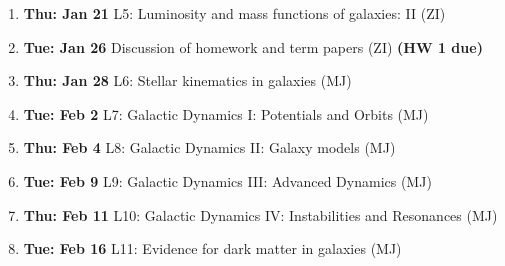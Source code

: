 \documentclass[10pt]{article}
\begin{document}
\begin{enumerate}
  \item {\bf Thu: Jan 21}    L5: Luminosity and mass functions of galaxies: II (ZI)

  \item {\bf Tue: Jan 26}   Discussion of homework and term papers (ZI) {\bf (HW 1 due)}

  \item {\bf Thu: Jan 28}    L6: Stellar kinematics in galaxies (MJ)

  \item {\bf Tue: Feb 2}    L7: Galactic Dynamics I: Potentials and Orbits (MJ)  

 \item {\bf Thu: Feb 4}     L8: Galactic Dynamics II: Galaxy models (MJ)

  \item {\bf Tue: Feb 9}     L9: Galactic Dynamics III: Advanced Dynamics (MJ)

  \item {\bf Thu: Feb 11}     L10: Galactic Dynamics IV: Instabilities and Resonances (MJ)

  \item {\bf Tue: Feb 16}    L11: Evidence for dark matter in galaxies (MJ)


\end{enumerate}
\end{document}
